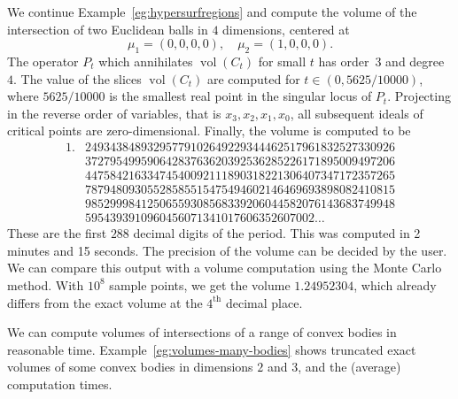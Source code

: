 \documentclass[sigconf, nonacm]{acmart} %
\DeclareMathOperator{\vol}{vol}
\begin{document}
\begin{example}\label{eq:l24}
    We continue Example~\ref{eg:hypersurfregions} and compute the volume of the intersection of two Euclidean balls in $4$ dimensions, centered at 
    $$\mu_1 = (0,0,0,0),\quad \mu_2 = (1,0,0,0).$$ The operator $P_t$ which annihilates $\vol(C_t)$ for small $t$ has order~$3$ and degree~$4$. The value of the slices $\vol(C_t)$ are computed for $t \in (0, 5625/10000)$, where $5625/10000$ is the smallest real point in the singular locus of $P_t$. 
    Projecting in the reverse order of variables, that is $x_3, x_2, x_1, x_0$, all subsequent ideals of critical points are zero-dimensional. Finally, the volume is computed to be 
    \begin{align*}
        1.&24934384893295779102649229344462517961832527330926\\&37279549959064283763620392536285226171895009497206\\&44758421633474540092111890318221306407347172357265\\&78794809305528585515475494602146469693898082410815\\&98529998412506559308568339206044582076143683749948\\&5954393910960456071341017606352607002 \ldots
    \end{align*}
    These are the first $288$ decimal digits of the period. This was computed in 2 minutes and 15 seconds.
    The precision of the volume can be decided by the user. We can compare this output with a volume computation using the Monte Carlo method. With $10^8$ sample points, we get the volume $1.24952304$, which already differs from the exact volume at the $4^{\text{th}}$ decimal place.
\end{example}


We can compute volumes of intersections of a range of convex bodies in reasonable time. Example~\ref{eg:volumes-many-bodies} shows truncated exact volumes of some convex bodies in dimensions $2$ and $3$, and the (average) computation times. 
\end{document}
